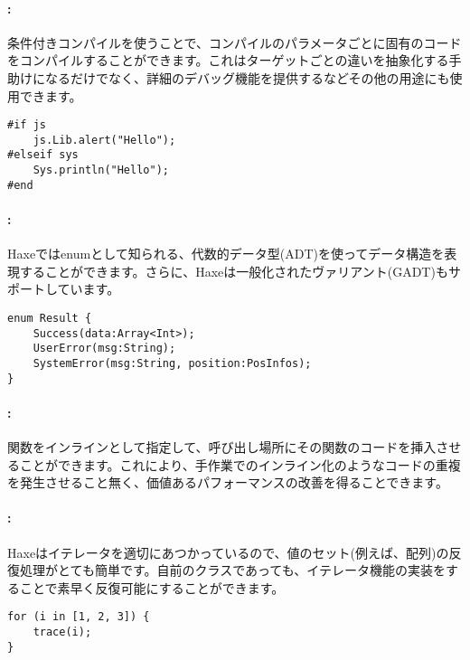 \paragraph{:}

条件付きコンパイルを使うことで、コンパイルのパラメータごとに固有のコードをコンパイルすることができます。これはターゲットごとの違いを抽象化する手助けになるだけでなく、詳細のデバッグ機能を提供するなどその他の用途にも使用できます。

\begin{lstlisting}
#if js
    js.Lib.alert("Hello");
#elseif sys
    Sys.println("Hello");
#end
\end{lstlisting}

\paragraph{:}

Haxeではenumとして知られる、代数的データ型(ADT)を使ってデータ構造を表現することができます。さらに、Haxeは一般化されたヴァリアント(GADT)もサポートしています。

\begin{lstlisting}
enum Result {
    Success(data:Array<Int>);
    UserError(msg:String);
    SystemError(msg:String, position:PosInfos);
}
\end{lstlisting}

\paragraph{:}

関数をインラインとして指定して、呼び出し場所にその関数のコードを挿入させることができます。これにより、手作業でのインライン化のようなコードの重複を発生させること無く、価値あるパフォーマンスの改善を得ることできます。

\paragraph{:}

Haxeはイテレータを適切にあつかっているので、値のセット(例えば、配列)の反復処理がとても簡単です。自前のクラスであっても、イテレータ機能の実装をすることで素早く反復可能にすることができます。

\begin{lstlisting}
for (i in [1, 2, 3]) {
    trace(i);
}
\end{lstlisting}

